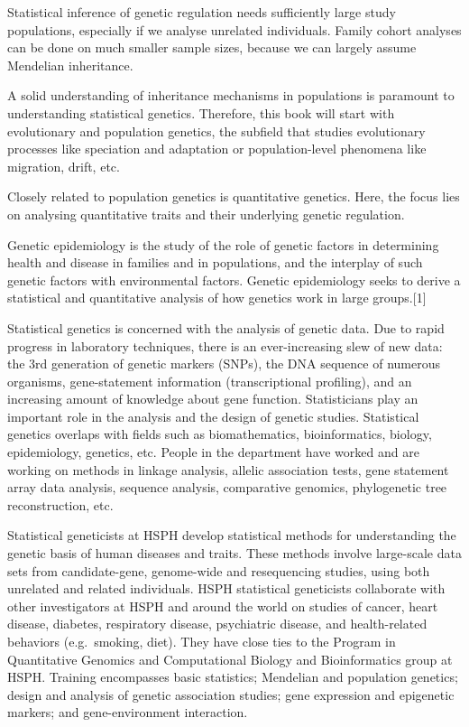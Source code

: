\documentclass[12pt,]{krantz}
\renewenvironment{quote}{\begin{VF}}{\end{VF}}
\theoremstyle{definition}
\theoremstyle{definition}
\theoremstyle{definition}
\theoremstyle{remark}
\begin{document}
Statistical inference of genetic regulation needs sufficiently large
study populations, especially if we analyse unrelated individuals.
Family cohort analyses can be done on much smaller sample sizes, because
we can largely assume Mendelian inheritance.

A solid understanding of inheritance mechanisms in populations is
paramount to understanding statistical genetics. Therefore, this book
will start with evolutionary and population genetics, the subfield that
studies evolutionary processes like speciation and adaptation or
population-level phenomena like migration, drift, etc.

Closely related to population genetics is quantitative genetics. Here,
the focus lies on analysing quantitative traits and their underlying
genetic regulation.

\begin{quote}
Genetic epidemiology is the study of the role of genetic factors in
determining health and disease in families and in populations, and the
interplay of such genetic factors with environmental factors. Genetic
epidemiology seeks to derive a statistical and quantitative analysis of
how genetics work in large groups.{[}1{]}
\end{quote}

\begin{quote}
Statistical genetics is concerned with the analysis of genetic data. Due
to rapid progress in laboratory techniques, there is an ever-increasing
slew of new data: the 3rd generation of genetic markers (SNPs), the DNA
sequence of numerous organisms, gene-statement information
(transcriptional profiling), and an increasing amount of knowledge about
gene function. Statisticians play an important role in the analysis and
the design of genetic studies. Statistical genetics overlaps with fields
such as biomathematics, bioinformatics, biology, epidemiology, genetics,
etc. People in the department have worked and are working on methods in
linkage analysis, allelic association tests, gene statement array data
analysis, sequence analysis, comparative genomics, phylogenetic tree
reconstruction, etc.
\end{quote}

\begin{quote}
Statistical geneticists at HSPH develop statistical methods for
understanding the genetic basis of human diseases and traits. These
methods involve large-scale data sets from candidate-gene, genome-wide
and resequencing studies, using both unrelated and related individuals.
HSPH statistical geneticists collaborate with other investigators at
HSPH and around the world on studies of cancer, heart disease, diabetes,
respiratory disease, psychiatric disease, and health-related behaviors
(e.g.~smoking, diet). They have close ties to the Program in
Quantitative Genomics and Computational Biology and Bioinformatics group
at HSPH. Training encompasses basic statistics; Mendelian and population
genetics; design and analysis of genetic association studies; gene
expression and epigenetic markers; and gene-environment interaction.
\end{quote}
\end{document}
